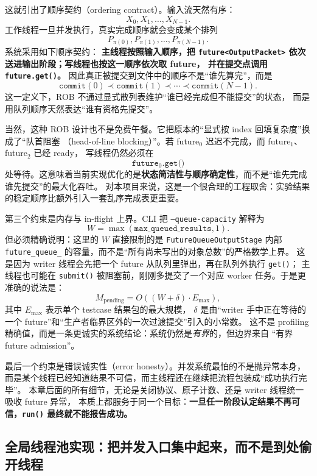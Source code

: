 这就引出了顺序契约（ordering contract）。输入流天然有序：
\[
    X_0,X_1,\ldots,X_{N-1}.
\]
工作线程一旦并发执行，真实完成顺序就会变成某个排列
\[
    P_{\pi(0)},P_{\pi(1)},\ldots,P_{\pi(N-1)}.
\]
系统采用如下顺序契约：
\textbf{主线程按照输入顺序，把 \texttt{future<OutputPacket>} 依次送进输出阶段；写线程也按这一顺序依次取 future，
    并在提交点调用 \texttt{future.get()}。}
因此真正被提交到文件中的顺序不是“谁先算完”，而是
\[
    \texttt{commit}(0)
    \prec
    \texttt{commit}(1)
    \prec
    \cdots
    \prec
    \texttt{commit}(N-1).
\]
这一定义下，ROB 不通过显式散列表维护“谁已经完成但不能提交”的状态，
而是用队列顺序天然表达“谁有资格先提交”。

当然，这种 ROB 设计也不是免费午餐。它把原本的“显式按 index 回填复杂度”换成了“队首阻塞
（head-of-line blocking）”。若 future$_0$ 迟迟不完成，而 future$_1$、future$_2$ 已经 ready，
写线程仍然必须在
\[
    \texttt{future}_0.\texttt{get()}
\]
处等待。这意味着当前实现优化的是\textbf{状态简洁性与顺序确定性}，而不是“谁先完成谁先提交”的最大化吞吐。
对本项目来说，这是一个很合理的工程取舍：实验结果的稳定顺序比额外引入一套乱序完成表更重要。

第三个约束是内存与 in-flight 上界。CLI 把 \texttt{--queue-capacity} 解释为
\[
    W=\max(\texttt{max\_queued\_results},1).
\]
但必须精确说明：这里的 $W$ 直接限制的是
\texttt{FutureQueueOutputStage} 内部 \texttt{future\_queue\_} 的容量，而不是“所有尚未写出的对象总数”的严格数学上界。
这是因为 writer 线程会先把一个 future 从队列里弹出，再在队列外执行 \texttt{get()}；
主线程也可能在 \texttt{submit()} 被阻塞前，刚刚多提交了一个对应 worker 任务。于是更准确的说法是：
\[
    M_{\mathrm{pending}}
    =
    O((W+\delta)\cdot E_{\max}),
\]
其中 $E_{\max}$ 表示单个 testcase 结果包的最大规模，
$\delta$ 是由“writer 手中正在等待的一个 future”和“生产者临界区外的一次过渡提交”引入的小常数。
这不是 profiling 精确值，而是一条更诚实的系统结论：系统仍然是\emph{有界}的，但边界来自
``有界 future admission''。

最后一个约束是错误诚实性（error honesty）。并发系统最怕的不是抛异常本身，
而是某个线程已经知道结果不可信，而主线程还在继续把流程包装成“成功执行完毕”。
本章后面的所有细节，无论是关闭协议、原子计数、还是 writer 线程统一吸收 future 异常，
本质上都服务于同一个目标：\textbf{一旦任一阶段认定结果不再可信，\texttt{run()} 最终就不能报告成功。}

\subsection{全局线程池实现：把并发入口集中起来，而不是到处偷开线程}

